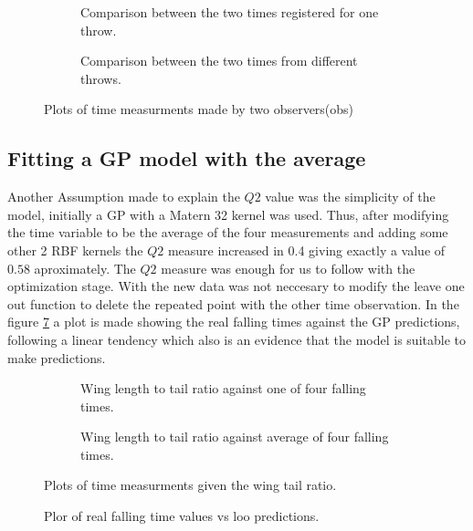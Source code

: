 \begin{figure}
	\begin{subfigure}[h]{.5\linewidth}
		
		\caption{Comparison between the two times registered for one throw.}
		\label{fig_EX1_EX1}
	\end{subfigure}
	\begin{subfigure}[h]{.5\linewidth}
		
		\caption{Comparison between the two times from different throws.}
		\label{fig_EX1_EX2}
	\end{subfigure}
	\caption{Plots of time measurments made by two observers(obs)}
\end{figure}

\subsection{Fitting a GP model with the average}

Another Assumption made to explain the $Q2$ value was the simplicity of the model, initially a GP with a Matern 32 kernel was used. Thus, after modifying the time variable to be the average of the four measurements and adding some other 2 RBF kernels the $Q2$ measure increased in 0.4 giving exactly a value of $0.58$ aproximately. The $Q2$ measure was enough for us to follow with the optimization stage. With the new data was not neccesary to modify the leave one out function to delete the repeated point with the other time observation. In the figure \ref{mloo_vs_real} a plot is made showing the real falling times against the GP predictions, following a linear tendency which also is an evidence that the model is suitable to make predictions.


\begin{figure}
	\begin{subfigure}[h]{.5\linewidth}
		
		\caption{Wing length to tail ratio against one of four falling times.}
		\label{fig_wtr_vs_obs2}
	\end{subfigure}
	\begin{subfigure}[h]{.5\linewidth}
		
		\caption{Wing length to tail ratio against average of four falling times.}
		\label{fig_wtr_vs_avg4}
	\end{subfigure}
	\caption{Plots of time measurments given the wing tail ratio.}
\end{figure}

\begin{figure}[h]
	\centering
	
	\caption{Plor of real falling time values vs loo predictions.}
	\label{mloo_vs_real}
\end{figure}

